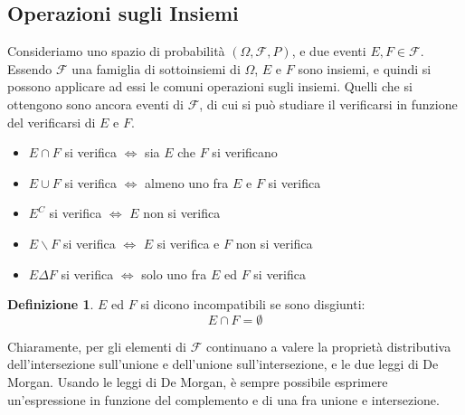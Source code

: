 \documentclass{article}
\theoremstyle{plain}
\theoremstyle{definition}
\newtheorem{definizione}{Definizione}[section]
\theoremstyle{remark}
\begin{document}
\subsection{Operazioni sugli Insiemi} %
\label{sub:operazioni_sugli_insiemi}
Consideriamo uno spazio di probabilità $(\Omega,\mathscr{F},P)$, e due eventi $E,F\in\mathscr{F}$. Essendo $\mathscr{F}$ una famiglia di sottoinsiemi di $\Omega$, $E$ e $F$ sono insiemi, e quindi si possono applicare ad essi le comuni operazioni sugli insiemi. Quelli che si ottengono sono ancora eventi di $\mathscr{F}$, di cui si può studiare il verificarsi in funzione del verificarsi di $E$ e $F$.
\begin{itemize}
	\item $E\cap F$ si verifica $\Leftrightarrow$ sia $E$ che $F$ si verificano
	\item $E\cup F$ si verifica $\Leftrightarrow$ almeno uno fra $E$ e $F$ si verifica
	\item $E^C$ si verifica $\Leftrightarrow$ $E$ non si verifica
	\item $E\smallsetminus F$ si verifica $\Leftrightarrow$ $E$ si verifica e $F$ non si verifica
	\item $E\Delta F$ si verifica $\Leftrightarrow$ solo uno fra $E$ ed $F$ si verifica
\end{itemize}
\begin{definizione}
	$E$ ed $F$ si dicono incompatibili se sono disgiunti:
	\begin{equation*}
		E\cap F=\emptyset
	\end{equation*}
\end{definizione}
Chiaramente, per gli elementi di $\mathscr{F}$ continuano a valere la proprietà distributiva dell'intersezione sull'unione e dell'unione sull'intersezione, e le due leggi di De Morgan. Usando le leggi di De Morgan, è sempre possibile esprimere un'espressione in funzione del complemento e di una fra unione e intersezione.
\end{document}
